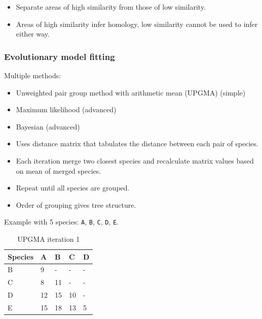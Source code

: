 \documentclass[a4paper]{article}
\begin{document}
\begin{itemize}
  \item
    Separate areas of high similarity from those of low similarity.

  \item
    Areas of high similarity infer homology, low similarity cannot be used to
    infer either way.
\end{itemize}

\subsubsection{Evolutionary model fitting}

Multiple methods:

\begin{itemize}
  \item
    Unweighted pair group method with arithmetic mean (UPGMA) (simple)

  \item
    Maximum likelihood (advanced)

  \item
    Bayesian (advanced)
\end{itemize}


\begin{itemize}
  \item
    Uses distance matrix that tabulates the distance between each pair of
    species.

  \item
    Each iteration merge two closest species and recalculate matrix values based
    on mean of merged species.

  \item
    Repeat until all species are grouped.

  \item
    Order of grouping gives tree structure.
\end{itemize}

Example with 5 species: \texttt{A}, \texttt{B}, \texttt{C}, \texttt{D},
\texttt{E}.

\begin{table}[h!]
  \centering
  \begin{tabular}{@{}lllll@{}}
    \toprule
    Species & A  & B  & C  & D \\
    \midrule
    B       & 9  & -  & -  & - \\
    C       & 8  & 11 & -  & - \\
    D       & 12 & 15 & 10 & - \\
    E       & 15 & 18 & 13 & 5 \\
    \bottomrule
  \end{tabular}
  \caption{UPGMA iteration 1}
  \label{tab:upgma_1}
\end{table}
\FloatBarrier
\end{document}
